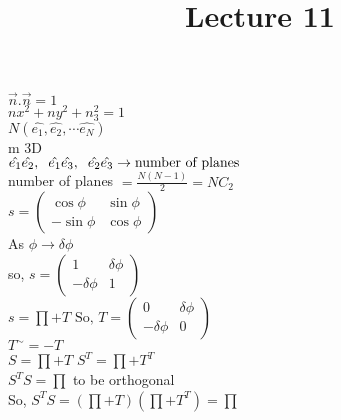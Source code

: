 \documentclass[12]{article}
\begin{document}
\title{Lecture 11}
\maketitle

$\vec{n}.\vec{n}=1$\\

$nx^{2}+ny^{2}+n_{3}^{2}=1$\\

$N(\hat{e_{1}}, \hat{e_{2}}, \cdots \hat{e_{N}})$\\

m 3D \\

$\hat{e_{1}} \hat{e_{2}}, \hspace{2mm} \hat{e_{1}}\hat{e_{3}}, \hspace{2mm} \hat{e_{2}}\hat{e_{3}} \rightarrow \mbox{number of planes}$\\

number of planes $= \frac{N(N-1)}{2}=NC_{2}$\\

$s=\begin{pmatrix}
\cos \phi & \sin \phi\\
- \sin \phi & \cos \phi
\end{pmatrix}$\\

As $\phi
 \rightarrow \delta \phi$\\
 
 so, $s=\begin{pmatrix}
 1 & \delta \phi\\
 -\delta \phi & 1
 \end{pmatrix}$\\
 
 $s=\prod + T$ \hspace{5mm} $\mbox{So, } T=\begin{pmatrix}
 0 & \delta \phi\\
 -\delta \phi & 0
 \end{pmatrix}$\\
 
 $T^{\sim} =-T$\\
 
 $S=\prod + T$ \hspace{5mm} $S^{T}=\prod + T^{T}$\\
 
 $S^{T}S=\prod$ \hspace{5mm} to be orthogonal\\
 
 So, $S^{T}S=(\prod +T)(\prod + T^{T})=\prod$\\
 
\end{document}
